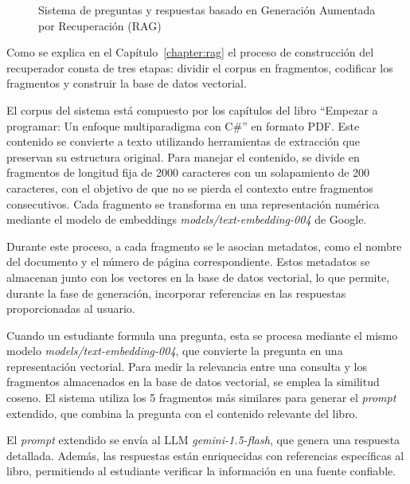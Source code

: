 \documentclass{article}
\begin{document}
\begin{figure}[h!]
    \caption{Sistema de preguntas y respuestas basado en Generación Aumentada por Recuperación (RAG)}\label{fig:q-a-diagram}
\end{figure}

Como se explica en el Capítulo~\ref{chapter:rag} el proceso de construcción del recuperador consta de tres etapas: dividir el corpus en fragmentos, codificar los fragmentos y construir la base de datos vectorial.

El corpus del sistema está compuesto por los capítulos del libro ``Empezar a programar: Un enfoque multiparadigma con C\#'' en formato PDF. Este contenido se convierte a texto utilizando herramientas de extracción que preservan su estructura original. Para manejar el contenido, se divide en fragmentos de longitud fija de 2000 caracteres con un solapamiento de 200 caracteres, con el objetivo de que no se pierda el contexto entre fragmentos consecutivos. Cada fragmento se transforma en una representación numérica mediante el modelo de embeddings \textit{models/text-embedding-004} de Google.

Durante este proceso, a cada fragmento se le asocian metadatos, como el nombre del documento y el número de página correspondiente. Estos metadatos se almacenan junto con los vectores en la base de datos vectorial, lo que permite, durante la fase de generación, incorporar referencias en las respuestas proporcionadas al usuario.

Cuando un estudiante formula una pregunta, esta se procesa mediante el mismo modelo \textit{models/text-embedding-004}, que convierte la pregunta en una representación vectorial. Para medir la relevancia entre una consulta y los fragmentos almacenados en la base de datos vectorial, se emplea la similitud coseno. El sistema utiliza los 5 fragmentos más similares para generar el \textit{prompt} extendido, que combina la pregunta con el contenido relevante del libro.

El \textit{prompt} extendido se envía al LLM \textit{gemini-1.5-flash}, que genera una respuesta detallada. Además, las respuestas están enriquecidas con referencias específicas al libro, permitiendo al estudiante verificar la información en una fuente confiable.
\end{document}
